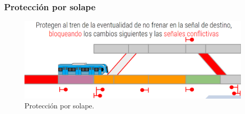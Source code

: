 \subsubsection{Protección por solape}

\lipsum[1]

    \begin{figure}[!h]
        \centering
        \includegraphics[width=1\textwidth]{Figuras/solape}
        \centering\caption{Protección por solape.}
        \label{fig:solape_1}
    \end{figure}
    
\lipsum[1]